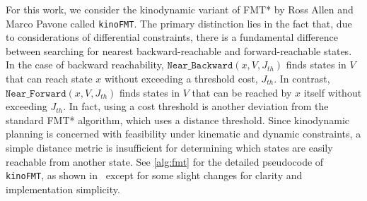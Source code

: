 For this work, we consider the kinodynamic variant of FMT* by Ross Allen and Marco Pavone called \texttt{kinoFMT}. The primary distinction lies in the fact that, due to considerations of differential constraints, there is a fundamental difference between searching for nearest backward-reachable and forward-reachable states. In the case of backward reachability, $\texttt{Near\_Backward}(x,V,J_{th})$ finds states in $V$ that can reach state $x$ without exceeding a threshold cost, $J_{th}$. In contrast, $\texttt{Near\_Forward}(x,V,J_{th})$ finds states in $V$ that can be reached by $x$ itself without exceeding $J_{th}$. In fact, using a cost threshold is another deviation from the standard FMT* algorithm, which uses a distance threshold. Since kinodynamic planning is concerned with feasibility under kinematic and dynamic constraints, a simple distance metric is insufficient for determining which states are easily reachable from another state. See \autoref{alg:fmt} for the detailed pseudocode of \texttt{kinoFMT}, as shown in~\cite{Allen2016} except for some slight changes for clarity and implementation simplicity.

\begin{algorithm}
\caption{$\texttt{kinoFMT}(x_{init}, X_{goal}, \mathbb{X}, n, J_{th})$}
\label{alg:fmt}
\begin{algorithmic}[1]
    \label{fmt:V}
    \State{$\E \gets \emptyset $}
    \label{fmt:WH}
    \label{fmt:loopz1}
        \label{fmt:z1}
        \label{fmt:loopz2}
        \label{fmt:loopx1}        
            \label{fmt:loopx2}
            \label{fmt:dynprogram}
            \label{fmt:col}
                \label{fmt:col1}
                \label{fmt:col2}
            \EndIf{}
        \EndFor{}
        \label{fmt:empty1}
            \label{fmt:empty2}
        \EndIf{}
        \label{fmt:z2}
    \EndWhile{}
\end{algorithmic}{}
\end{algorithm}

